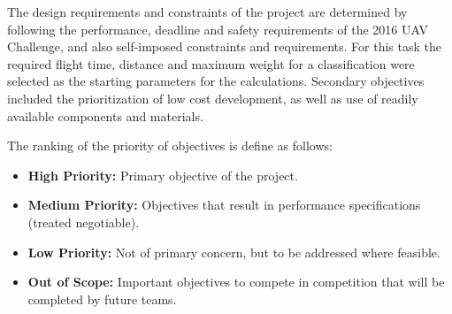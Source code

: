 The design requirements and constraints of the project are determined by following the performance, deadline and safety requirements of the 2016 UAV Challenge, and also self-imposed constraints and requirements. For this task the required flight time, distance and maximum weight for a classification were selected as the starting parameters for the calculations. Secondary objectives included the prioritization of low cost development, as well as use of readily available components and materials.\\


The ranking of the priority of objectives is define as follows:


\begin{itemize}
	\item \textbf{High Priority:} Primary objective of the project.
	\item \textbf{Medium Priority:} Objectives that result in performance specifications (treated negotiable).
	\item \textbf{Low Priority:} Not of primary concern, but to be addressed where feasible.
	\item \textbf{Out of Scope:} Important objectives to compete in competition that will be completed by future teams.
\end{itemize}

